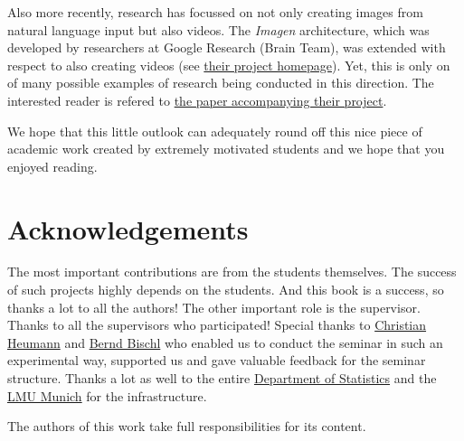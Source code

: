 \documentclass[
]{krantz}
\begin{document}
Also more recently, research has focussed on not only creating images from natural language input but also videos. The \emph{Imagen} architecture, which was developed by researchers at Google Research (Brain Team), was extended with respect to also creating videos (see \href{https://imagen.research.google/video/}{their project homepage}).
Yet, this is only on of many possible examples of research being conducted in this direction. The interested reader is refered to \href{https://imagen.research.google/video/paper.pdf}{the paper accompanying their project}.

We hope that this little outlook can adequately round off this nice piece of academic work created by extremely motivated students and we hope that you enjoyed reading.

\hypertarget{acknowledgements}{%
\chapter{Acknowledgements}\label{acknowledgements}}

The most important contributions are from the students themselves.
The success of such projects highly depends on the students.
And this book is a success, so thanks a lot to all the authors!
The other important role is the supervisor.
Thanks to all the supervisors who participated!
Special thanks to \href{https://www.misoda.statistik.uni-muenchen.de/personen/professoren/heumann/index.html}{Christian Heumann} and \href{https://www.statistik.uni-muenchen.de/personen/professoren/bischl/index.html}{Bernd Bischl} who enabled us to conduct the seminar in such an experimental way, supported us and gave valuable feedback for the seminar structure.
Thanks a lot as well to the entire \href{https://www.statistik.uni-muenchen.de/}{Department of Statistics} and the \href{http://www.en.uni-muenchen.de/index.html}{LMU Munich} for the infrastructure.

The authors of this work take full responsibilities for its content.

  

\backmatter
\printindex
\end{document}

